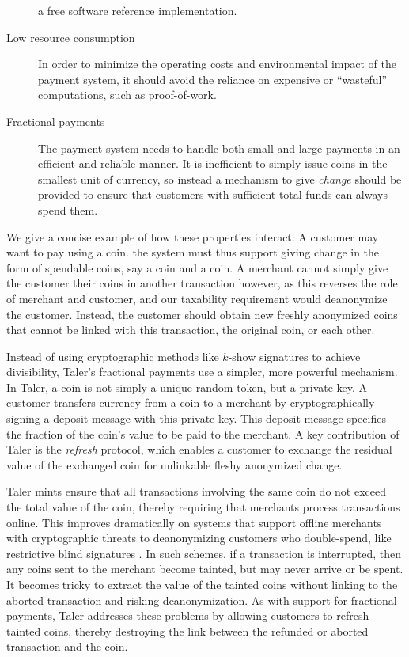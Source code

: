 \documentclass{llncs}
\begin{document}
\begin{description}
    a free software reference implementation.
  \item[Low resource consumption] 
    In order to minimize the operating costs and environmental impact of
    the payment system, it should avoid the reliance on expensive or
    ``wasteful'' computations, such as proof-of-work.
  \item[Fractional payments] 
    The payment system needs to handle both small and large payments in
    an efficient and reliable manner.  It is inefficient to simply issue
    coins in the smallest unit of currency, so instead a mechanism to
    give {\em change} should be provided to ensure that customers with
    sufficient total funds can always spend them.
\end{description}
%
We give a concise example of how these properties interact:
A customer may want to pay  using a  coin. 
the system must thus support giving change in the form of spendable coins,
say a  coin and a  coin.  
A merchant cannot simply give the customer their coins in another transaction
however, as this reverses the role of merchant and customer, and
our taxability requirement would deanonymize the customer.
Instead, the customer should obtain new freshly anonymized coins that cannot be
linked with this transaction, the original  coin, or each other.

Instead of using cryptographic methods like $k$-show signatures
\cite{brands1993efficient} to achieve divisibility, 
Taler's fractional payments use a simpler, more powerful mechanism. 
In Taler, a coin is not simply a unique random token, but a private key. 
A customer transfers currency from a coin to a merchant by cryptographically
signing a deposit message with this private key.  This deposit message
specifies the fraction of the coin's value to be paid to the merchant. 
A key contribution of Taler is the {\em refresh} protocol, which enables 
a customer to exchange the residual value of the exchanged coin for 
unlinkable fleshy anonymized change.  

Taler mints ensure that all transactions involving the same coin 
do not exceed the total value of the coin, thereby
 requiring that merchants process transactions online.
This improves dramatically on systems that support offline merchants with
cryptographic threats to deanonymizing customers who double-spend, like
restrictive blind signatures \cite{brands1993efficient}.
In such schemes, if a transaction is interrupted, then any coins sent to
the merchant become tainted, but may never arrive or be spent.  
It becomes tricky to extract the value of the tainted coins without linking
to the aborted transaction and risking deanonymization.
As with support for fractional payments, Taler addresses these problems by
allowing customers to refresh tainted coins, thereby destroying the link
between the refunded or aborted transaction and the coin.
\end{document}
